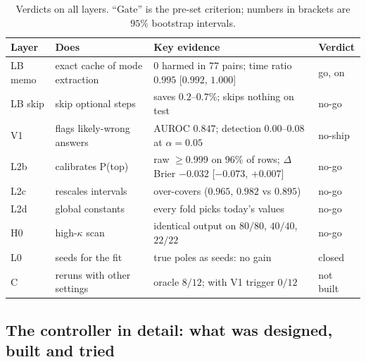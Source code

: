 \documentclass[11pt]{article}
\theoremstyle{plain}
\theoremstyle{definition}
\theoremstyle{remark}
\begin{document}
\begin{table}[tbp]
\centering\small
\caption{Verdicts on all layers. ``Gate'' is the pre-set criterion; numbers in brackets are $95\%$ bootstrap intervals.}\label{tab:verdicts}
\begin{tabular}{@{}llp{5.6cm}l@{}}
\toprule
Layer & Does & Key evidence & Verdict\\
\midrule
LB memo & exact cache of mode extraction & $0$ harmed in $77$ pairs; time ratio $0.995$ [$0.992$, $1.000$] & go, on\\
LB skip & skip optional steps & saves $0.2$--$0.7\%$; skips nothing on test & no-go\\
V1 & flags likely-wrong answers & AUROC $0.847$; detection $0.00$--$0.08$ at $\alpha=0.05$ & no-ship\\
L2b & calibrates P(top) & raw $\ge0.999$ on $96\%$ of rows; $\Delta$Brier $-0.032$ [$-0.073$, $+0.007$] & no-go\\
L2c & rescales intervals & over-covers ($0.965$, $0.982$ vs $0.895$) & no-go\\
L2d & global constants & every fold picks today's values & no-go\\
H0 & high-$\kappa$ scan & identical output on $80/80$, $40/40$, $22/22$ & no-go\\
L0 & seeds for the fit & true poles as seeds: no gain & closed\\
C & reruns with other settings & oracle $8/12$; with V1 trigger $0/12$ & not built\\
\bottomrule
\end{tabular}
\end{table}


\subsection{The controller in detail: what was designed, built and tried}\label{sec:controller-built}
\end{document}
